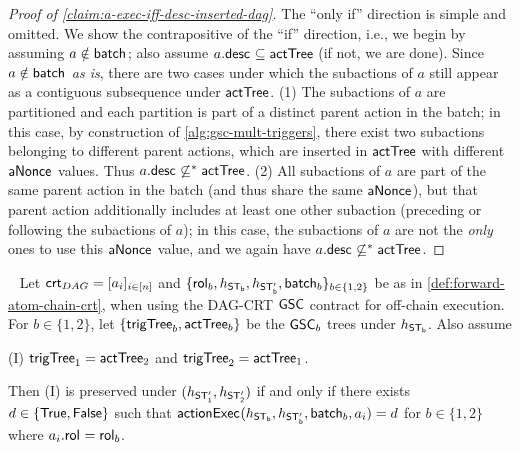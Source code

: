 \begin{proof}[Proof of \cref{claim:a-exec-iff-desc-inserted-dag}]
     The ``only if'' direction is simple and omitted. We show the contrapositive of the ``if'' direction, i.e., we begin by assuming $a \notin \mathsf{batch}_{}$; also assume $a.\mathsf{desc}_{} \subseteq \mathsf{actTree}$ (if not, we are done). Since $a \notin \mathsf{batch}_{}$ \emph{as is}, there are two cases under which the subactions of $a$ still appear as a contiguous subsequence under $\mathsf{actTree}$. (1) The subactions of $a$ are partitioned and each partition is part of a distinct parent action in the batch; in this case, by construction of \cref{alg:gsc-mult-triggers}, there exist two subactions belonging to different parent actions, which are inserted in $\mathsf{actTree}$ with different $\mathsf{aNonce_{}}$ values. Thus $a.\mathsf{desc}_{} \not \subseteq^* \mathsf{actTree}$. (2) All subactions of $a$ are part of the same parent action in the batch (and thus share the same $\mathsf{aNonce_{}}$), but that parent action additionally includes at least one other subaction (preceding or following the subactions of $a$); in this case, the subactions of $a$ are not the \emph{only} ones to use this $\mathsf{aNonce_{}}$ value, and we again have $a.\mathsf{desc}_{} \not \subseteq^* \mathsf{actTree}$.
\end{proof}



\begin{lemma}~\label{lem:dag-gsc-all-or-none-exec}
    Let $\mathsf{crt}_{DAG} = [a_i]_{i \in [n]}$ and $\{\mathsf{rol}_{b}, h_{\mathsf{ST_{b}}}, h_{\mathsf{ST_{b}'}}, \mathsf{batch}_{b}\}_{b \in \{1,2\}}$ be as in \cref{def:forward-atom-chain-crt}, when using the DAG-CRT $\mathsf{GSC}$ contract for off-chain execution. For $b \in \{1,2\}$, let $\{\mathsf{trigTree}_b, \mathsf{actTree}_b \}$ be the $\mathsf{GSC}_b$ trees under $h_{\mathsf{ST_{b}}}$.
    Also assume 
    
    \noindent(I) $\mathsf{trigTree}_1 = \mathsf{actTree}_2$ and $\mathsf{trigTree}_2 = \mathsf{actTree}_1$.

    Then (I) is preserved under $(h_{\mathsf{ST_{1}'}}, h_{\mathsf{ST_{2}'}})$ if and only if there exists $d \in \{\mathsf{True}, \mathsf{False}\}$ such that $\mathsf{actionExec}_{}(h_{\mathsf{ST_{b}}}, h_{\mathsf{ST_{b}'}}, \mathsf{batch}_{b}, a_i) = d$ for $b \in \{1,2\}$ where $a_i.\mathsf{rol}_{} = \mathsf{rol}_{b}$.
\end{lemma}

